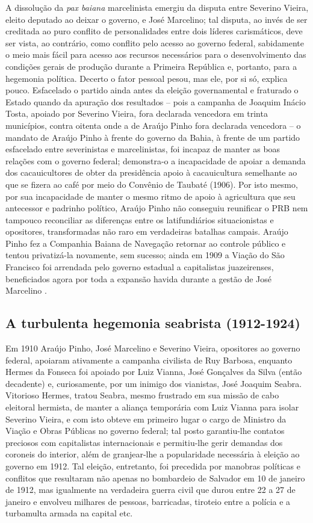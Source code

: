 A dissolução da \textit{pax baiana} marcelinista emergiu da disputa entre Severino Vieira, eleito deputado ao deixar o governo, e José Marcelino; tal disputa, ao invés de ser creditada ao puro conflito de personalidades entre dois líderes carismáticos, deve ser vista, ao contrário, como conflito pelo acesso ao governo federal, sabidamente o meio mais fácil para acesso aos recursos necessários para o desenvolvimento das condições gerais de produção durante a Primeira República e, portanto, para a hegemonia política. Decerto o fator pessoal pesou, mas ele, por si só, explica pouco. Esfacelado o partido ainda antes da eleição governamental e fraturado o Estado quando da apuração dos resultados -- pois a campanha de Joaquim Inácio Tosta, apoiado por Severino Vieira, fora declarada vencedora em trinta municípios, contra oitenta onde a de Araújo Pinho fora declarada vencedora -- o mandato de Araújo Pinho à frente do governo da Bahia, à frente de um partido esfacelado entre severinistas e marcelinistas, foi incapaz de manter as boas relações com o governo federal; demonstra-o a incapacidade de apoiar a demanda dos cacauicultores de obter da presidência apoio à cacauicultura semelhante ao que se fizera ao café por meio do Convênio de Taubaté (1906). Por isto mesmo, por sua incapacidade de manter o mesmo ritmo de apoio à agricultura que seu antecessor e padrinho político, Araújo Pinho não conseguiu reunificar o PRB nem tampouco reconciliar as diferenças entre os latifundiários situacionistas e opositores, transformadas não raro em verdadeiras batalhas campais. Araújo Pinho fez a Companhia Baiana de Navegação retornar ao controle público e tentou privatizá-la novamente, sem sucesso; ainda em 1909 a Viação do São Francisco foi arrendada pelo governo estadual a capitalistas juazeirenses, beneficiados agora por toda a expansão havida durante a gestão de José Marcelino \cite[pp.~220-221]{CUNHA2011}.

\subsection{A turbulenta hegemonia seabrista (1912-1924)}

Em 1910 Araújo Pinho, José Marcelino e Severino Vieira, opositores ao governo federal, apoiaram ativamente a campanha civilista de Ruy Barbosa, enquanto Hermes da Fonseca foi apoiado por Luiz Vianna, José Gonçalves da Silva (então decadente) e, curiosamente, por um inimigo dos vianistas, José Joaquim Seabra. Vitorioso Hermes, tratou Seabra, mesmo frustrado em sua missão de cabo eleitoral hermista, de manter a aliança temporária com Luiz Vianna para isolar Severino Vieira, e com isto obteve em primeiro lugar o cargo de Ministro da Viação e Obras Públicas no governo federal; tal posto garantiu-lhe contatos preciosos com capitalistas internacionais e permitiu-lhe gerir demandas dos coroneis do interior, além de granjear-lhe a popularidade necessária à eleição ao governo em 1912. Tal eleição, entretanto, foi precedida por manobras políticas e conflitos que resultaram não apenas no bombardeio de Salvador em 10 de janeiro de 1912, mas igualmente na verdadeira guerra civil que durou entre 22 a 27 de janeiro e envolveu milhares de pessoas, barricadas, tiroteio entre a polícia e a turbamulta armada na capital etc. 

